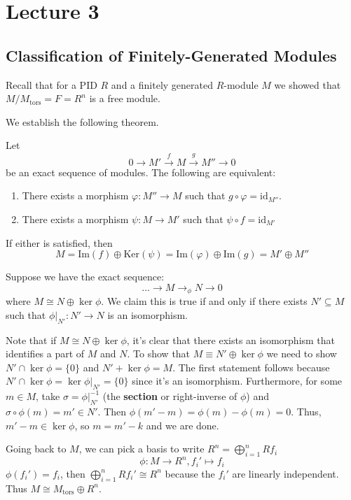\section{Lecture 3}

\subsection{Classification of Finitely-Generated Modules}
Recall that for a PID $R$ and a finitely generated $R$-module $M$ we showed that $M/M_{\text{tors}} = F = R^n$ is
a free module.

We establish the following theorem.
\begin{theorem}
    Let 
    \[ 0 \to M' \xrightarrow{f} M \xrightarrow{g} M'' \to 0 \]
    be an exact sequence of modules. The following are equivalent:
    \begin{enumerate}
        \item There exists a morphism $\varphi: M'' \to M$ such that $g \circ \varphi = \text{id}_{M''}$.
        \item There exists a morphism $\psi: M \to M'$ such that $\psi \circ f = \text{id}_{M'}$
    \end{enumerate}
    If either is satisfied, then 
    \[ M = \textrm{Im} (f) \oplus \textrm{Ker} (\psi) = \textrm{Im}(\varphi) \oplus \textrm{Im}(g) = M' \oplus M'' \]

\end{theorem}


Suppose we have the exact sequence:
\[ \dots \to M \to_{\phi} N \to 0 \]
where $M \cong N \oplus \ker \phi$. We claim this is true if and only if
there exists $N' \subseteq M$ such that $\phi\Big|_{N'}: N' \to N$ is an isomorphism.

Note that if $M \cong N \oplus \ker \phi$, it's clear that there exists an isomorphism that identifies a part of $M$ and $N$. To show that $M \equiv N' \oplus \ker \phi$ we need to show $N' \cap \ker \phi = \{0\}$ and $N' + \ker \phi = M$.
The first statement follows because $N' \cap \ker \phi = \ker \phi \Big|_{N'} = \{0\}$ since it's an isomorphism.
Furthermore, for some $m \in M$, take $\sigma = \phi|_{N'}^{-1}$ (the \textbf{section} or right-inverse of $\phi$) and $\sigma \circ \phi(m) = m' \in N'$. Then $\phi(m' - m) = \phi(m) - \phi(m) = 0$.
Thus, $m' - m \in \ker \phi$, so $m = m' - k$ and we are done.

Going back to $M$, we can pick a basis to write $R^n = \bigoplus_{i = 1}^n Rf_i$
\[ \phi: M \to R^n, f_i' \mapsto f_i\]
$\phi(f_i') = f_i$, then $\bigoplus_{i = 1}^n Rf_i' \cong R^n$ because the $f_i'$ are linearly independent. Thus $M \cong M_{\text{tors}} \oplus R^n$.

